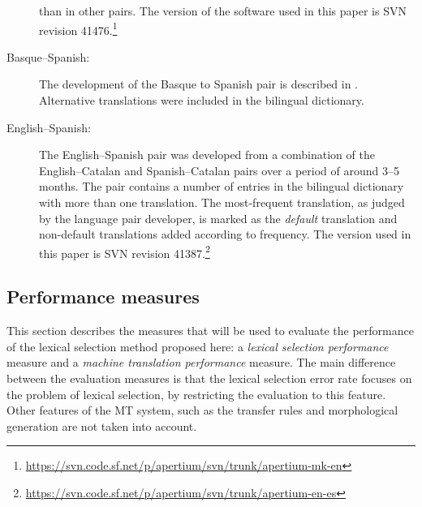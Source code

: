 \documentclass[11pt]{article}
\newcommand{\comment}[1]{\todo{#1}}
\begin{document}
\begin{description}
than in other pairs.  
The version of
  the software used in this paper is SVN revision
  41476.\footnote{\url{https://svn.code.sf.net/p/apertium/svn/trunk/apertium-mk-en}}
\item[Basque--Spanish:] The development of the Basque to Spanish pair
  is described in \cite{ginesti09}. 
  Alternative translations were included in the bilingual
  dictionary.

\item[English--Spanish:] The English--Spanish pair was developed from
  a combination of the English--Catalan and Spanish--Catalan pairs
  over a period of around 3--5 months. The pair 
  contains a number of entries in the bilingual dictionary with
  more than one translation. The most-frequent translation, as judged
  by the language pair developer, is marked as the \emph{default}
  translation and non-default translations added according to
  frequency. 
 The version used in this paper is SVN revision
  41387.\footnote{\url{https://svn.code.sf.net/p/apertium/svn/trunk/apertium-en-es}}
\end{description}


\subsection{Performance measures}
\label{ss:measures}

This section describes the measures that will be used to evaluate the
performance of the lexical selection method proposed here: a
\emph{lexical selection performance} measure and a \emph{machine
  translation performance} measure. The main difference between the
evaluation measures is that the lexical selection error rate focuses on 
the problem of lexical selection, by restricting the evaluation to
this feature. Other features of the MT system, such as the transfer rules
and morphological generation are not taken into account.
\end{document}
